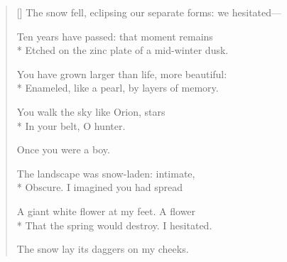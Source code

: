 \label{ch:etching}
\settowidth{\versewidth}{The snow fell, eclipsing our separate forms: we hesitated---}
\begin{verse}[\versewidth]
The snow fell, eclipsing our separate forms: we hesitated---

Ten years have passed: that moment remains\\*
Etched on the zinc plate of a mid-winter dusk.

You have grown larger than life, more beautiful:\\*
Enameled, like a pearl, by layers of memory.

You walk the sky like Orion, stars\\*
In your belt, O hunter.

 \qquad  \qquad  \qquad  \qquad Once you were a boy.

The landscape was snow-laden: intimate,\\*
Obscure.  I imagined you had spread

A giant white flower at my feet.  A flower\\*
That the spring would destroy.   I hesitated.

The snow lay its daggers on my cheeks.
\end{verse}
